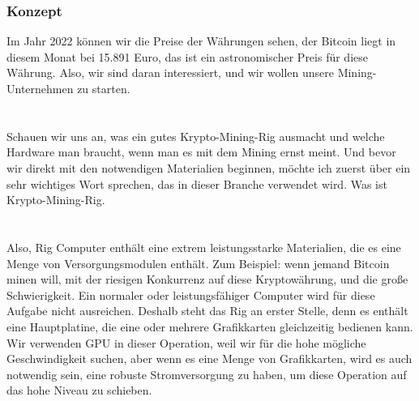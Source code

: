 \documentclass[ngerman]{scrreprt}
\begin{document}
\subsubsection{Konzept}
Im Jahr 2022 können wir die Preise der Währungen sehen, der Bitcoin liegt in diesem Monat bei 15.891 Euro, das ist ein astronomischer Preis für diese Währung. Also, wir sind daran interessiert, und wir wollen unsere Mining-Unternehmen zu starten. \\ \\ \\ 
Schauen wir uns an, was ein gutes Krypto-Mining-Rig ausmacht und welche Hardware man braucht, wenn man es mit dem Mining ernst meint. Und bevor wir direkt mit den notwendigen Materialien beginnen, möchte ich zuerst über ein sehr wichtiges Wort sprechen, das in dieser Branche verwendet wird. Was ist Krypto-Mining-Rig. \\ \\ \\ 
Also, Rig Computer enthält eine extrem leistungsstarke Materialien, die es eine Menge von Versorgungsmodulen enthält. Zum Beispiel: wenn jemand Bitcoin minen will, mit der riesigen Konkurrenz auf diese Kryptowährung, und die große Schwierigkeit. Ein normaler oder leistungsfähiger Computer wird für diese Aufgabe nicht ausreichen. Deshalb steht das Rig an erster Stelle, denn es enthält eine Hauptplatine, die eine oder mehrere Grafikkarten gleichzeitig bedienen kann. Wir verwenden GPU in dieser Operation, weil wir für die hohe mögliche Geschwindigkeit suchen, aber wenn es eine Menge von Grafikkarten, wird es auch notwendig sein, eine robuste Stromversorgung zu haben, um diese Operation auf das hohe Niveau zu schieben.
\newpage
\end{document}
